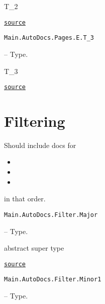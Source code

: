 \begin{adjustwidth}{2em}{0pt}

T\_2



\href{https://github.com/BambOoxX/Documenter.jl/blob/d157febde213549ed0d45c894f0651560da477d3/test/examples/pages/e.jl#L29}{\texttt{source}}


\end{adjustwidth}
\hypertarget{3237252152661731042}{\texttt{Main.AutoDocs.Pages.E.T\_3}}  -- {Type.}

\begin{adjustwidth}{2em}{0pt}

T\_3



\href{https://github.com/BambOoxX/Documenter.jl/blob/d157febde213549ed0d45c894f0651560da477d3/test/examples/pages/e.jl#L32}{\texttt{source}}


\end{adjustwidth}

\section{Filtering}



\label{6391929926972855801}{}


Should include docs for



\begin{itemize}
\item {}


\item {}


\item {}

\end{itemize}


in that order.


\hypertarget{6785702989282266947}{\texttt{Main.AutoDocs.Filter.Major}}  -- {Type.}

\begin{adjustwidth}{2em}{0pt}

abstract super type



\href{https://github.com/BambOoxX/Documenter.jl/blob/d157febde213549ed0d45c894f0651560da477d3/test/examples/make.jl#L129}{\texttt{source}}


\end{adjustwidth}
\hypertarget{11704274081303557511}{\texttt{Main.AutoDocs.Filter.Minor1}}  -- {Type.}

